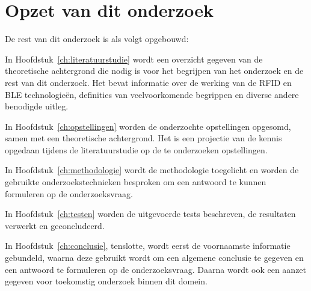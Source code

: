 \section{Opzet van dit onderzoek}
\label{sec:opzet-bachelorproef}

De rest van dit onderzoek is als volgt opgebouwd:

In Hoofdstuk~\ref{ch:literatuurstudie} wordt een overzicht gegeven van de theoretische achtergrond die nodig is voor het begrijpen van het onderzoek en de rest van dit onderzoek. Het bevat informatie over de werking van de RFID en BLE technologieën, definities van veelvoorkomende begrippen en diverse andere benodigde uitleg.

In Hoofdstuk~\ref{ch:opstellingen} worden de onderzochte opstellingen opgesomd, samen met een theoretische achtergrond. Het is een projectie van de kennis opgedaan tijdens de literatuurstudie op de te onderzoeken opstellingen.

In Hoofdstuk~\ref{ch:methodologie} wordt de methodologie toegelicht en worden de gebruikte onderzoekstechnieken besproken om een antwoord te kunnen formuleren op de onderzoeksvraag.

In Hoofdstuk~\ref{ch:testen} worden de uitgevoerde tests beschreven, de resultaten verwerkt en geconcludeerd.

In Hoofdstuk~\ref{ch:conclusie}, tenslotte, wordt eerst de voornaamste informatie gebundeld, waarna deze gebruikt wordt om een algemene conclusie te gegeven en een antwoord te formuleren op de onderzoeksvraag. Daarna wordt ook een aanzet gegeven voor toekomstig onderzoek binnen dit domein.